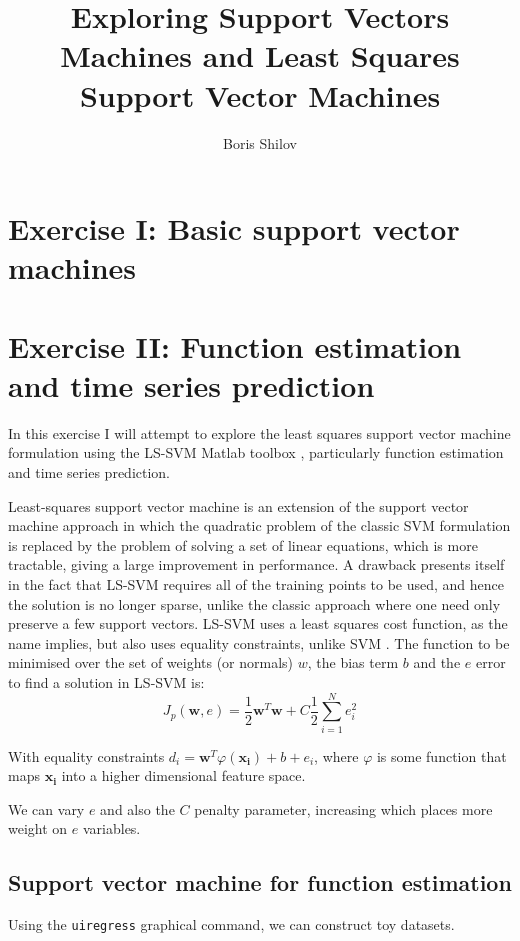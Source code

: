 \documentclass[10pt,a4paper]{article}
\title{Exploring Support Vectors Machines and Least Squares Support Vector Machines}
\author{Boris Shilov}
\begin{document}
\maketitle
\section{Exercise I: Basic support vector machines}
\section{Exercise II: Function estimation and time series prediction}

In this exercise I will attempt to explore the least squares support vector machine formulation using the LS-SVM Matlab toolbox \cite{pelckmansLSSVMlabMATLABToolbox}, particularly function estimation and time series prediction. 

Least-squares support vector machine is an extension of the support vector machine approach in which the quadratic problem of the classic SVM formulation is replaced by the problem of solving a set of linear equations, which is more tractable, giving a large improvement in performance. A drawback presents itself in the fact that LS-SVM requires all of the training points to be used, and hence the solution is no longer sparse, unlike the classic approach where one need only preserve a few support vectors. LS-SVM uses a least squares cost function, as the name implies, but also uses equality constraints, unlike SVM \cite{valyonRobustLSSVMRegression2007}. The function to be minimised over the set of weights (or normals) $w$, the bias term $b$ and the $e$ error to find a solution in LS-SVM is:
$$
J_p(\mathbf{w}, e) = \frac{1}{2}\mathbf{w}^T\mathbf{w} + C \frac{1}{2} \sum^N_{i=1}{e^2_i}
$$

With equality constraints $d_i = \mathbf{w}^T\varphi(\mathbf{x_i}) + b + e_i$, where $\varphi$ is some function that maps $\mathbf{x_i}$ into a higher dimensional feature space.

We can vary $e$ and also the $C$ penalty parameter, increasing which places more weight on $e$ variables.

\subsection{Support vector machine for function estimation}
Using the \texttt{uiregress} graphical command, we can construct toy datasets. 
\end{document}

